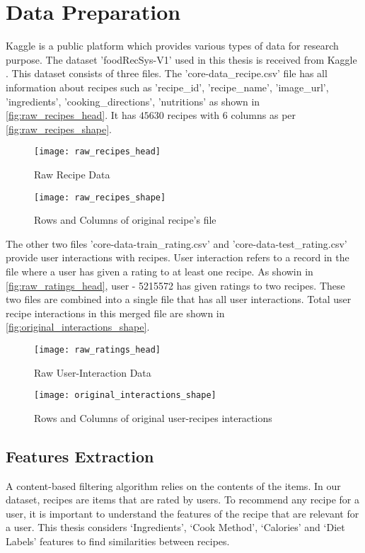 
\section{Data Preparation}
\label{sec:data_prep}
Kaggle is a public platform which provides various types of data for research purpose. The dataset 'foodRecSys-V1' used in this thesis is received from Kaggle \cite{48}. This dataset consists of three files. The 'core-data\_recipe.csv' file has all information about recipes such as 'recipe\_id', 'recipe\_name', 'image\_url', 'ingredients', 'cooking\_directions', 'nutritions' as shown in \autoref{fig:raw_recipes_head}. It has $45630$ recipes with $6$ columns as per \autoref{fig:raw_recipes_shape}.

\begin{figure}[H]
	\centering
	\texttt{[image: raw\_recipes\_head]}
	\caption{Raw Recipe Data}
	\label{fig:raw_recipes_head}
\end{figure}

\begin{figure}[H]
	\centering
	\texttt{[image: raw\_recipes\_shape]}
	\caption{Rows and Columns of original recipe's file}
	\label{fig:raw_recipes_shape}
\end{figure}

\noindent The other two files 'core-data-train\_rating.csv' and 'core-data-test\_rating.csv' provide user interactions with recipes. User interaction refers to a record in the file where a user has given a rating to at least one recipe. As showin in \autoref{fig:raw_ratings_head}, user - 5215572 has given ratings to two recipes. These two files are combined into a single file that has all user interactions.  Total user recipe interactions in this merged file are shown in \autoref{fig:original_interactions_shape}.

\begin{figure}[H]
	\centering
	\texttt{[image: raw\_ratings\_head]}
	\caption{Raw User-Interaction Data}
	\label{fig:raw_ratings_head}
\end{figure}

\begin{figure}[H]
	\centering
	\texttt{[image: original\_interactions\_shape]}
	\caption{Rows and Columns of original user-recipes interactions }
	\label{fig:original_interactions_shape}
\end{figure}  


\subsection{Features Extraction}
A content-based filtering algorithm relies on the contents of the items. In our dataset, recipes are items that are rated by users. To recommend any recipe for a user, it is important to understand the features of the recipe that are relevant for a user. This thesis considers  `Ingredients', `Cook Method', `Calories' and `Diet Labels' features to find similarities between recipes.

